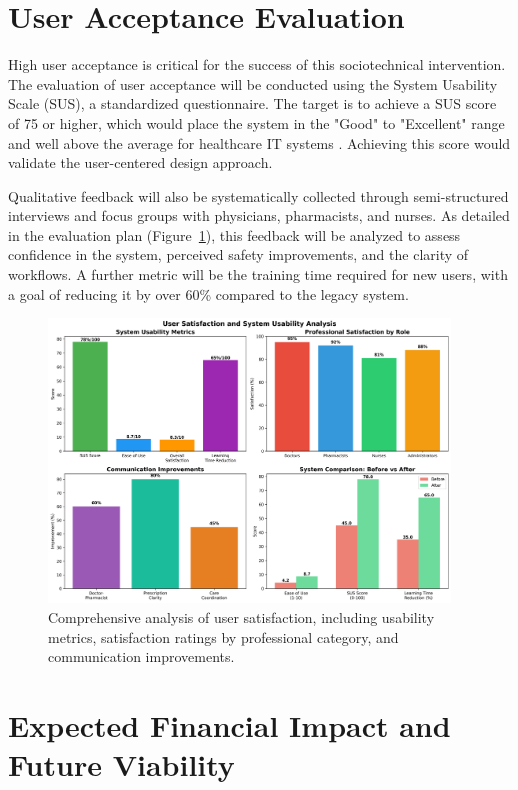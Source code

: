 \section{User Acceptance Evaluation}

High user acceptance is critical for the success of this sociotechnical intervention. The evaluation of user acceptance will be conducted using the System Usability Scale (SUS), a standardized questionnaire. The target is to achieve a SUS score of 75 or higher, which would place the system in the "Good" to "Excellent" range and well above the average for healthcare IT systems \cite{lewis2018}. Achieving this score would validate the user-centered design approach.

Qualitative feedback will also be systematically collected through semi-structured interviews and focus groups with physicians, pharmacists, and nurses. As detailed in the evaluation plan (Figure~\ref{fig:user-satisfaction}), this feedback will be analyzed to assess confidence in the system, perceived safety improvements, and the clarity of workflows. A further metric will be the training time required for new users, with a goal of reducing it by over 60\% compared to the legacy system.

\begin{figure}[htbp]
    \centering
    \includegraphics[width=0.95\textwidth]{images/generated/user_satisfaction.png}
    \caption{Comprehensive analysis of user satisfaction, including usability metrics, satisfaction ratings by professional category, and communication improvements.}
    \label{fig:user-satisfaction}
\end{figure}

\section{Expected Financial Impact and Future Viability}


